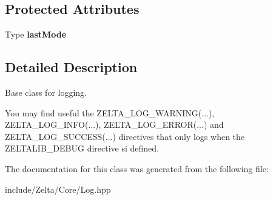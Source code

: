 \subsection*{Protected Attributes}
\begin{DoxyCompactItemize}
\item 
\mbox{\label{classzt_1_1_log_a95116d9d99af0b6196d17819b34f42d9}} 
Type {\bfseries last\+Mode}
\end{DoxyCompactItemize}


\subsection{Detailed Description}
Base class for logging. 

You may find useful the Z\+E\+L\+T\+A\+\_\+\+L\+O\+G\+\_\+\+W\+A\+R\+N\+I\+NG(...), Z\+E\+L\+T\+A\+\_\+\+L\+O\+G\+\_\+\+I\+N\+FO(...), Z\+E\+L\+T\+A\+\_\+\+L\+O\+G\+\_\+\+E\+R\+R\+OR(...) and Z\+E\+L\+T\+A\+\_\+\+L\+O\+G\+\_\+\+S\+U\+C\+C\+E\+SS(...) directives that only logs when the Z\+E\+L\+T\+A\+L\+I\+B\+\_\+\+D\+E\+B\+UG directive si defined. 

The documentation for this class was generated from the following file\+:\begin{DoxyCompactItemize}
\item 
include/\+Zelta/\+Core/Log.\+hpp\end{DoxyCompactItemize}
